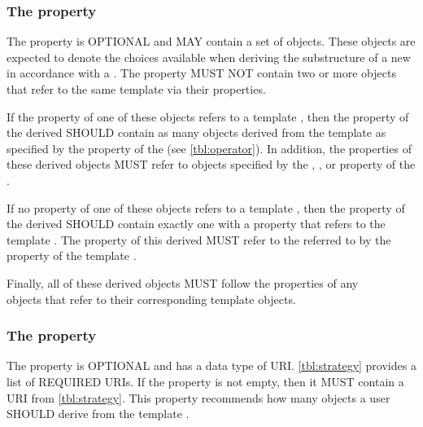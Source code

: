 \subsubsection*{ The  property}\label{sec:variableComponents}

The  property is OPTIONAL and MAY contain a set of  objects. These  objects are expected to denote the choices available when deriving the substructure of a new  in accordance with a . The  property MUST NOT contain two or more  objects that refer to the same template  via their  properties.

If the  property of one of these  objects refers to a template , then the  property of the derived  SHOULD contain as many  objects derived from the template  as specified by the  property of the  (see \ref{tbl:operator}). In addition, the  properties of these derived  objects MUST refer to  objects specified by the , , or  property of the .

If no  property of one of these  objects refers to a template , then the  property of the derived  SHOULD contain exactly one  with a  property that refers to the template . The  property of this derived  MUST refer to the  referred to by the  property of the template .

Finally, all of these derived  objects MUST follow the  properties of any \\
 objects that refer to their corresponding template  objects.

\subsubsection*{ The  property}\label{sec:strategy}
The  property is OPTIONAL and has a data type of URI. \ref{tbl:strategy} provides a list of REQUIRED  URIs. If the  property is not empty, then it MUST contain a URI from \ref{tbl:strategy}. This property recommends how many  objects a user SHOULD derive from the template .


